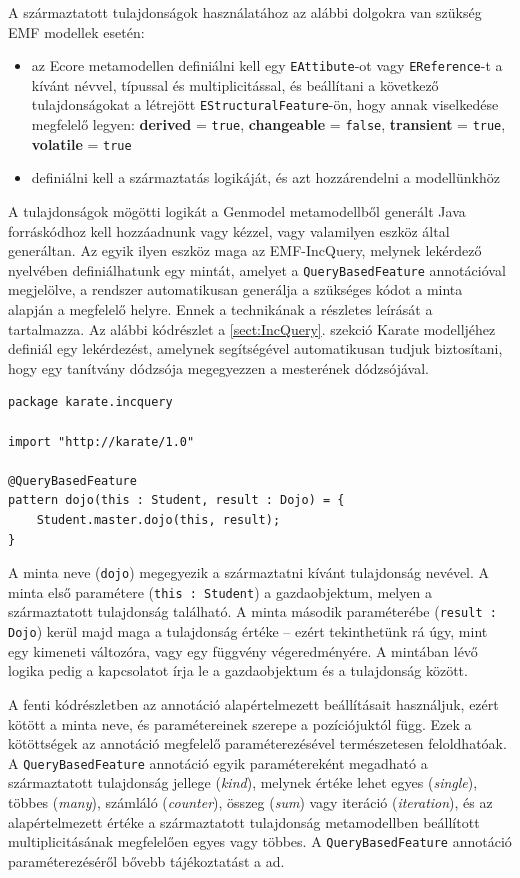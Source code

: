 A származtatott tulajdonságok használatához az alábbi dolgokra van szükség EMF modellek esetén:
\begin{itemize}
    \item az Ecore metamodellen definiálni kell egy \texttt{EAttibute}-ot vagy \texttt{EReference}-t a kívánt névvel, típussal és multiplicitással, és beállítani a következő tulajdonságokat a létrejött \texttt{EStructuralFeature}-ön, hogy annak viselkedése megfelelő legyen: \textbf{derived} = \texttt{true}, \textbf{changeable} = \texttt{false}, \textbf{transient} = \texttt{true}, \textbf{volatile} = \texttt{true}
    \item definiálni kell a származtatás logikáját, és azt hozzárendelni a modellünkhöz
\end{itemize}
A tulajdonságok mögötti logikát a Genmodel metamodellből generált Java forráskódhoz kell hozzáadnunk vagy kézzel, vagy valamilyen eszköz által generáltan.
Az egyik ilyen eszköz maga az EMF-IncQuery, melynek lekérdező nyelvében definiálhatunk egy mintát, amelyet a \texttt{QueryBasedFeature} annotációval megjelölve, a rendszer automatikusan generálja a szükséges kódot a minta alapján a megfelelő helyre. 
Ennek a technikának a részletes leírását a \cite{DerivedFeature} tartalmazza.
Az alábbi kódrészlet a \ref{sect:IncQuery}. szekció Karate modelljéhez definiál egy lekérdezést, amelynek segítségével automatikusan tudjuk biztosítani, hogy egy tanítvány dódzsója megegyezzen a mesterének dódzsójával.
%
\begin{lstlisting}
package karate.incquery

import "http://karate/1.0"

@QueryBasedFeature
pattern dojo(this : Student, result : Dojo) = {
    Student.master.dojo(this, result);
}
\end{lstlisting}
%
A minta neve (\texttt{dojo}) megegyezik a származtatni kívánt tulajdonság nevével.
A minta első paramétere (\texttt{this : Student}) a gazdaobjektum, melyen a származtatott tulajdonság található.
A minta második paraméterébe (\texttt{result : Dojo}) kerül majd maga a tulajdonság értéke -- ezért tekinthetünk rá úgy, mint egy kimeneti változóra, vagy egy függvény végeredményére.
A mintában lévő logika pedig a kapcsolatot írja le a gazdaobjektum és a tulajdonság között.

A fenti kódrészletben az annotáció alapértelmezett beállításait használjuk, ezért kötött a minta neve, és paramétereinek szerepe a pozíciójuktól függ.
Ezek a kötöttségek az annotáció megfelelő paraméterezésével természetesen feloldhatóak.
A \texttt{QueryBasedFeature} annotáció egyik paramétereként megadható a származtatott tulajdonság jellege (\emph{kind}), melynek értéke lehet egyes (\emph{single}), többes (\emph{many}), számláló (\emph{counter}), összeg (\emph{sum}) vagy iteráció (\emph{iteration}), és az alapértelmezett értéke a származtatott tulajdonság metamodellben beállított multiplicitásának megfelelően egyes vagy többes.
A \texttt{QueryBasedFeature} annotáció paraméterezéséről bővebb tájékoztatást a \cite{DerivedFeature} ad.

